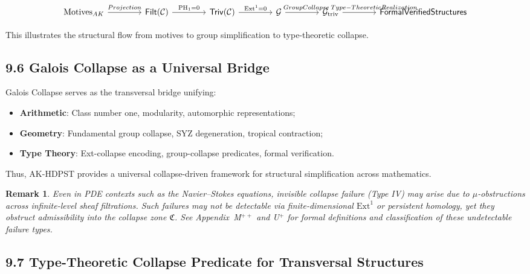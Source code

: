 \documentclass[11pt]{article}
\newtheorem{remark}[theorem]{Remark}
\begin{document}
\[
\begin{tikzcd}[column sep=4em]
\mathrm{Motives}_{AK} \arrow[r, "Projection"]
& \mathsf{Filt}(\mathcal{C}) \arrow[r, "\mathrm{PH}_1 = 0"]
& \mathsf{Triv}(\mathcal{C}) \arrow[r, "\mathrm{Ext}^1 = 0"]
& \mathcal{G} \arrow[r, "\hspace{1em}Group Collapse"]
& \mathcal{G}_{\mathrm{triv}} \arrow[r, "\hspace{3.5em}Type-Theoretic Realization"]
& \mathsf{Formal Verified Structures}
\end{tikzcd}
\]


This illustrates the structural flow from motives to group simplification to type-theoretic collapse.

\subsection*{9.6 Galois Collapse as a Universal Bridge}

Galois Collapse serves as the transversal bridge unifying:

\begin{itemize}
    \item \textbf{Arithmetic}: Class number one, modularity, automorphic representations;
    \item \textbf{Geometry}: Fundamental group collapse, SYZ degeneration, tropical contraction;
    \item \textbf{Type Theory}: Ext-collapse encoding, group-collapse predicates, formal verification.
\end{itemize}

Thus, AK-HDPST provides a universal collapse-driven framework for structural simplification across mathematics.

\begin{remark}
Even in PDE contexts such as the Navier--Stokes equations, invisible collapse failure (Type IV) may arise due to $\mu$-obstructions across infinite-level sheaf filtrations.
Such failures may not be detectable via finite-dimensional $\mathrm{Ext}^1$ or persistent homology, yet they obstruct admissibility into the collapse zone \( \mathfrak{C} \).
See Appendix~M$^{++}$ and U$^+$ for formal definitions and classification of these undetectable failure types.
\end{remark}


\subsection*{9.7 Type-Theoretic Collapse Predicate for Transversal Structures}
\end{document}
